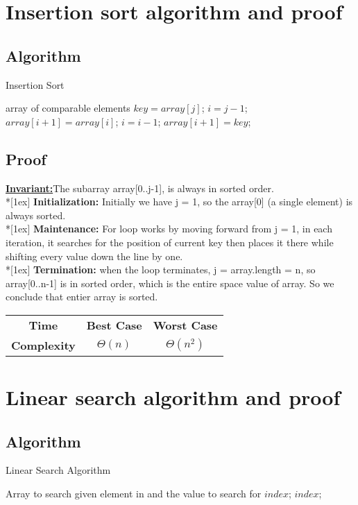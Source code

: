 \documentclass{article}
\newcommand{\Invariant}{\textbf{\underline{Invariant:}}}
\newcommand{\topic}[1]{\textbf{#1:}}
\newcommand{\ls}{\\*[1ex]}
\newcommand{\timecase}[2]{ 
    \vspace{1em}
    \begin{center}
    \begin{tabular}{ |c|c|c| }
    \hline
    \textbf{Time} & \textbf{Best Case} & \textbf{Worst Case} \\ \cline{2-3}
    \textbf{Complexity} & $\Theta \left( #1 \right)$ & $\Theta \left( #2 \right)$ \\ \cline{2-3}
    \hline
    \end{tabular}
    \end{center}
}
\begin{document}
\section{Insertion sort algorithm and proof}

\subsection{Algorithm}
\begin{algorithm}
    \caption{Insertion Sort}
    \begin{algorithmic}[1]
        \Require array of comparable elements
         
        \State $key = array[j]$;
        \State $i = j - 1$;
        \State $array[i + 1] = array[i]$;
        \State $i = i - 1$;
        \EndWhile
        \State $array[i + 1] = key$;
        \EndFor
        \EndFunction
    \end{algorithmic}
\end{algorithm}

\subsection{Proof}

\Invariant The subarray array[0..j-1], is always in sorted order.
\ls
\topic{Initialization} Initially we have j = 1, so the array[0] (a single element) is always sorted.
\ls
\topic{Maintenance} For loop works by moving forward from j = 1, in each iteration, it searches for the position of current key then places it there while shifting every value down the line by one.
\ls
\topic{Termination} when the loop terminates, j = array.length = n, so array[0..n-1] is in sorted order, which is the entire space value of array. So we conclude that entier array is sorted.

\timecase{n}{n^2}

\pagebreak

\section{Linear search algorithm and proof}

\subsection{Algorithm}
\begin{algorithm}
    \caption{Linear Search Algorithm}
    \begin{algorithmic}[1]
        \Require Array to search given element in and the value to search for
        \State \Return $index$;
        \EndIf
        \EndFor
        \State \Return $index$;
        \EndFunction
    \end{algorithmic}
\end{algorithm}
\end{document}
